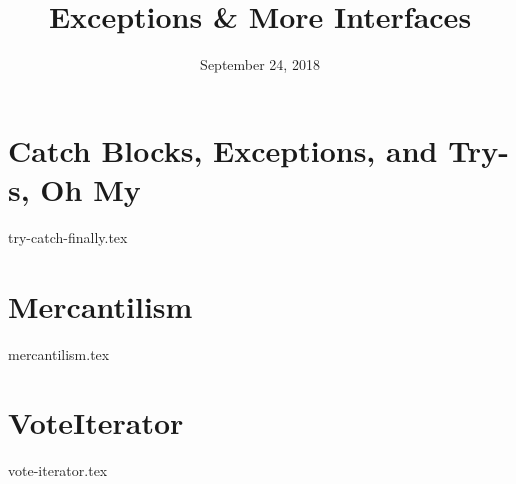 \documentclass[11pt]{exam}
\title{Exceptions \& More Interfaces}
\date{September 24, 2018}
\begin{document}
\maketitle

\section{Catch Blocks, Exceptions, and Try-s, Oh My}
\begin{questions}
{try-catch-finally.tex}
\end{questions}

\section{Mercantilism}
\begin{questions}
{mercantilism.tex}
\end{questions}

\section{VoteIterator}
\begin{questions}
{vote-iterator.tex}
\end{questions}
\end{document}
